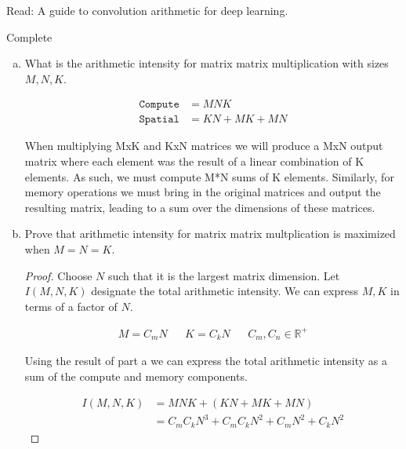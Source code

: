 \documentclass[11pt]{article}
\begin{document}
Read: A guide to convolution arithmetic for deep learning.
\begin{solution}
	Complete
\end{solution}

\begin{enumerate}[(a)]\itemsep0pt
  \item
    What is the arithmetic intensity for matrix matrix multiplication with
		sizes $M, N, K$.

\begin{solution}
	\begin{align}
		\texttt{Compute} &= M N K \\
		\texttt{Spatial} &= KN + MK + MN
	\end{align}

	When multiplying MxK and KxN matrices we will produce a MxN output matrix
	where each element was the result of a linear combination of K elements.
	As such, we must compute M*N sums of K elements.
	Similarly, for memory operations we must bring in the original matrices and output
	the resulting matrix, leading to a sum over the dimensions of these matrices.
\end{solution}

  \item
	  Prove that arithmetic intensity for matrix matrix multplication is
		maximized when $M=N=K$.
	\begin{proof}
		Choose $N$ such that it is the largest matrix dimension. Let $I(M, N,
		K)$ designate the total arithmetic intensity.
		We can express $M, K$ in terms of a factor of $N$.

		\begin{align}
			M = C_m N && K = C_k N && C_m, C_n \in \mathbb R^+
		\end{align}

		Using the result of part a we can express the total arithmetic
		intensity as a sum of the compute and memory components.

		\begin{align}
			I(M, N, K) &= M N K + \left(K N + M K + M N \right)\\
			& = C_m C_k N^3 + C_m C_k N^2 + C_m N^2 + C_k N^2
		\end{align}


\end{proof}
\end{enumerate}
\end{document}
